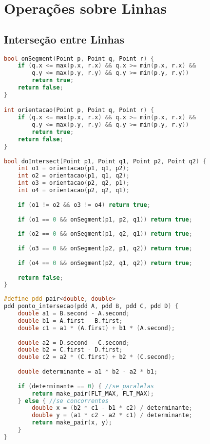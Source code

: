 \section{Operações sobre Linhas}
\subsection*{Interseção entre Linhas}
\begin{lstlisting}[language=C++, title={Checa se há intersecção entre linhas}]
bool onSegment(Point p, Point q, Point r) {
    if (q.x <= max(p.x, r.x) && q.x >= min(p.x, r.x) &&
        q.y <= max(p.y, r.y) && q.y >= min(p.y, r.y))
    	return true; 
    return false;
}

int orientacao(Point p, Point q, Point r) {
    if (q.x <= max(p.x, r.x) && q.x >= min(p.x, r.x) &&
        q.y <= max(p.y, r.y) && q.y >= min(p.y, r.y))
    	return true;
    return false;
}
 
bool doIntersect(Point p1, Point q1, Point p2, Point q2) {
    int o1 = orientacao(p1, q1, p2);
    int o2 = orientacao(p1, q1, q2);
    int o3 = orientacao(p2, q2, p1);
    int o4 = orientacao(p2, q2, q1);
 
    if (o1 != o2 && o3 != o4) return true;
 
    if (o1 == 0 && onSegment(p1, p2, q1)) return true;
 
    if (o2 == 0 && onSegment(p1, q2, q1)) return true;
 
    if (o3 == 0 && onSegment(p2, p1, q2)) return true;
 
    if (o4 == 0 && onSegment(p2, q1, q2)) return true;
 
    return false;
}

\end{lstlisting}
\begin{lstlisting}[language=C++, title={Retorna o ponto de intersecção}]
#define pdd pair<double, double>
pdd ponto_intersecao(pdd A, pdd B, pdd C, pdd D) {
    double a1 = B.second - A.second;
    double b1 = A.first - B.first;
    double c1 = a1 * (A.first) + b1 * (A.second);
 
    double a2 = D.second - C.second;
    double b2 = C.first - D.first;
    double c2 = a2 * (C.first) + b2 * (C.second);
 
    double determinante = a1 * b2 - a2 * b1;
 
    if (determinante == 0) { //se paralelas
        return make_pair(FLT_MAX, FLT_MAX);
    } else { //se concorrentes
        double x = (b2 * c1 - b1 * c2) / determinante;
        double y = (a1 * c2 - a2 * c1) / determinante;
        return make_pair(x, y);
    }
}
\end{lstlisting}
\newpage
